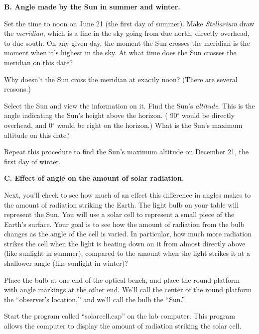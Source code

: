 {\bf B. Angle made by the Sun in summer and winter.}

\medskip


Set the time to noon on June 21 (the first day of summer).
Make \textit{Stellarium} draw the \textit{meridian}, which is a line 
in the sky going from due north, directly overhead, to due south.
On any given day,
the moment the Sun crosses the meridian is the moment when it's
highest in the sky.  
At what time does the Sun crosses the
meridian on this date?

\vskip 1in

Why doesn't the Sun cross the meridian at exactly noon?  (There
are several reasons.)

\vskip 2in

Select the Sun and view the information on it. Find the
Sun's \textit{altitude}.
This is the angle indicating the Sun's height above
the horizon. ( 90$^\circ$ would be directly overhead,
and 0$^\circ$ would be right on the horizon.)  What is the Sun's
maximum altitude on this date?

\vskip 1in

Repeat this procedure to find the Sun's maximum altitude on 
December 21, the first day of winter.

\vskip 1in



{\bf C. Effect of angle on the amount of solar radiation.}

\medskip

Next, you'll check to see how much of an effect this difference in angles
makes to the amount of radiation striking the Earth.  The light
bulb on your table will represent the Sun.  You will use a solar
cell to represent a small piece of the Earth's surface.
Your goal is to see how the
amount of radiation from the bulb changes as the
angle of the cell is varied. In particular, how much more radiation strikes
the cell when the light is beating down on it from almost directly above
(like sunlight in summer),
compared to the amount when the light strikes it at a shallower angle
(like sunlight in winter)?

Place the bulb at one end of the optical bench, and place
the round platform with angle markings at the other end.
We'll call the center of the round platform
the ``observer's location,'' and we'll call the bulb the ``Sun.''

Start the program called 
``solarcell.cap'' on the lab computer.  
This program allows the computer to display the amount of radiation striking
the solar cell.

